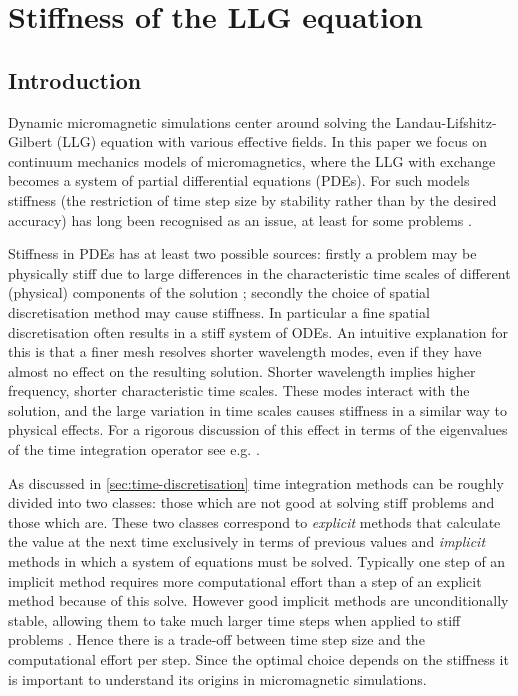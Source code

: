 
\chapter{Stiffness of the LLG equation}
\label{cha:stiffn-llg-equat}


\section{Introduction}

Dynamic micromagnetic simulations  center around solving the Landau-Lifshitz-Gilbert (LLG) equation with various effective fields.
In this paper we focus on continuum mechanics models of micromagnetics, where the LLG with exchange becomes a system of partial differential equations (PDEs).
For such models stiffness (the restriction of time step size by stability rather than by the desired accuracy) has long been recognised as an issue, at least for some problems
\cite{Nakatani1989}.

Stiffness in PDEs has at least two possible sources: 
firstly a problem may be physically stiff due to large differences in the characteristic time scales of different (physical) components of the solution \cite[Chap. 4]{Iserles2009};
secondly the choice of spatial discretisation method may cause stiffness.
In particular a fine spatial discretisation often results in a stiff system of ODEs.
An intuitive explanation for this is that a finer mesh resolves shorter wavelength modes, even if they have almost no effect on the resulting solution.
Shorter wavelength implies higher frequency, \ie shorter characteristic time scales.
These modes interact with the solution, and the large variation in time scales causes stiffness in a similar way to physical effects.
For a rigorous discussion of this effect in terms of the eigenvalues of the time integration operator see e.g. \cite[Sec 8.2]{Atkinson2009}.

As discussed in \cref{sec:time-discretisation} time integration methods can be roughly divided into two classes: those which are not good at solving stiff problems and those which are.
These two classes correspond to \emph{explicit} methods that calculate the value at the next time exclusively in terms of previous values and \emph{implicit} methods in which a system of equations must be solved. 
Typically one step of an implicit method requires more computational effort than a step of an explicit method because of this solve.
However good implicit methods are unconditionally stable, allowing them to take much larger time steps when applied to stiff problems \cite[Chap. 4]{Iserles2009}.
Hence there is a trade-off between time step size and the computational effort per step.
Since the optimal choice depends on the stiffness it is important to understand its origins in micromagnetic simulations.


